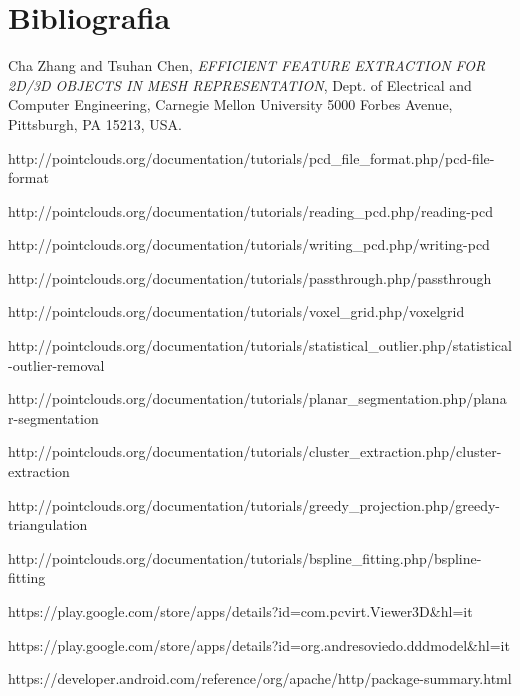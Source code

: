 

\cleardoublepage
\chapter{Bibliografia}

\nocite{*}

\begin{thebibliography}{14} %

Cha Zhang and Tsuhan Chen,
\emph{EFFICIENT FEATURE EXTRACTION FOR 2D/3D OBJECTS IN MESH REPRESENTATION},
Dept. of Electrical and Computer Engineering, Carnegie Mellon University 5000 Forbes Avenue, Pittsburgh, PA 15213, USA.

	http://pointclouds.org/documentation/tutorials/pcd\_file\_format.php/pcd-file-format

http://pointclouds.org/documentation/tutorials/reading\_pcd.php/reading-pcd

http://pointclouds.org/documentation/tutorials/writing\_pcd.php/writing-pcd

http://pointclouds.org/documentation/tutorials/passthrough.php/passthrough

http://pointclouds.org/documentation/tutorials/voxel\_grid.php/voxelgrid

http://pointclouds.org/documentation/tutorials/statistical\_outlier.php/statistical-outlier-removal

http://pointclouds.org/documentation/tutorials/planar\_segmentation.php/planar-segmentation

http://pointclouds.org/documentation/tutorials/cluster\_extraction.php/cluster-extraction

http://pointclouds.org/documentation/tutorials/greedy\_projection.php/greedy-triangulation

http://pointclouds.org/documentation/tutorials/bspline\_fitting.php/bspline-fitting

https://play.google.com/store/apps/details?id=com.pcvirt.Viewer3D\&hl=it

https://play.google.com/store/apps/details?id=org.andresoviedo.dddmodel\&hl=it

https://developer.android.com/reference/org/apache/http/package-summary.html


\end{thebibliography}